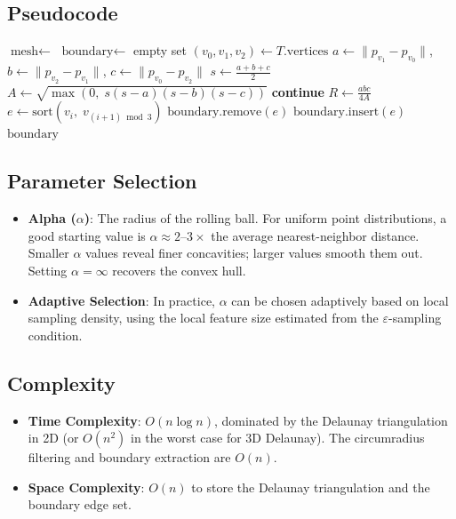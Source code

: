 \subsection{Pseudocode}
\begin{algorithm}
\caption{$\alpha$-Shape Computation (2D)}
\label{alg:alpha_shape_2d}
\begin{algorithmic}[1]
    \State $\text{mesh} \gets$ 
    \State $\text{boundary} \gets$ empty set 
        \State $(v_0, v_1, v_2) \gets T.\text{vertices}$
        \State $a \gets \|p_{v_1} - p_{v_0}\|$, $b \gets \|p_{v_2} - p_{v_1}\|$, $c \gets \|p_{v_0} - p_{v_2}\|$
        \State $s \gets \frac{a + b + c}{2}$
        \State $A \gets \sqrt{\max(0,\; s(s-a)(s-b)(s-c))}$
         \State \textbf{continue} \EndIf {}
        \State $R \gets \frac{abc}{4A}$
                \State $e \gets \text{sort}(v_i,\; v_{(i+1) \bmod 3})$
                    \State $\text{boundary}.\text{remove}(e)$
                \Else
                    \State $\text{boundary}.\text{insert}(e)$
                \EndIf
            \EndFor
        \EndIf
    \EndFor
    \State \Return $\text{boundary}$
\EndFunction
\end{algorithmic}
\end{algorithm}

\subsection{Parameter Selection}
\begin{itemize}
\item \textbf{Alpha ($\alpha$)}: The radius of the rolling ball. For uniform point distributions, a good starting value is $\alpha \approx 2 \text{--} 3 \times$ the average nearest-neighbor distance. Smaller $\alpha$ values reveal finer concavities; larger values smooth them out. Setting $\alpha = \infty$ recovers the convex hull.
\item \textbf{Adaptive Selection}: In practice, $\alpha$ can be chosen adaptively based on local sampling density, using the local feature size estimated from the $\varepsilon$-sampling condition.
\end{itemize}

\subsection{Complexity}
\begin{itemize}
\item \textbf{Time Complexity}: $O(n \log n)$, dominated by the Delaunay triangulation in 2D (or $O(n^2)$ in the worst case for 3D Delaunay). The circumradius filtering and boundary extraction are $O(n)$.
\item \textbf{Space Complexity}: $O(n)$ to store the Delaunay triangulation and the boundary edge set.
\end{itemize}

